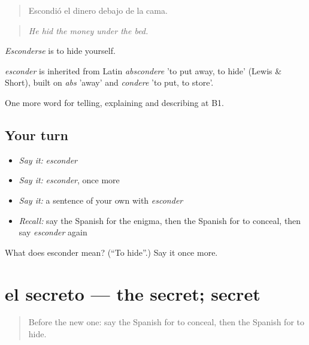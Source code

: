\begin{quote}
Escondió el dinero debajo de la cama.
\end{quote}

\begin{quote}
\emph{He hid the money under the bed.}
\end{quote}

\emph{Esconderse} is to hide yourself.

\begin{cousinweb}
\emph{esconder} is inherited from Latin \emph{abscondere} 'to put away, to hide' (Lewis \& Short), built on \emph{abs} 'away' and \emph{condere} 'to put, to store'.
\end{cousinweb}

\begin{grammarlens}[title={What you've built}]
One more word for telling, explaining and describing at B1.
\end{grammarlens}

\subsection*{Your turn}
\begin{itemize}
\raggedright
  \item \emph{Say it:} \emph{esconder}
  \item \emph{Say it:} \emph{esconder}, once more
  \item \emph{Say it:} a sentence of your own with \emph{esconder}
  \item \emph{Recall:} say the Spanish for the enigma, then the Spanish for to conceal, then say \emph{esconder} again
\end{itemize}

\begin{tcolorbox}[breakable,colback=teal!4,colframe=teal!35!black,title={Before you move on}]
What does esconder mean? (\textquotedblleft{}To hide\textquotedblright{}.) Say it once more.
\end{tcolorbox}
\section[el secreto]{el secreto — the secret; secret}

\label{lesson:ES-C532-secreto}



\begin{quote}
Before the new one: say the Spanish for to conceal, then the Spanish for to hide.
\end{quote}

